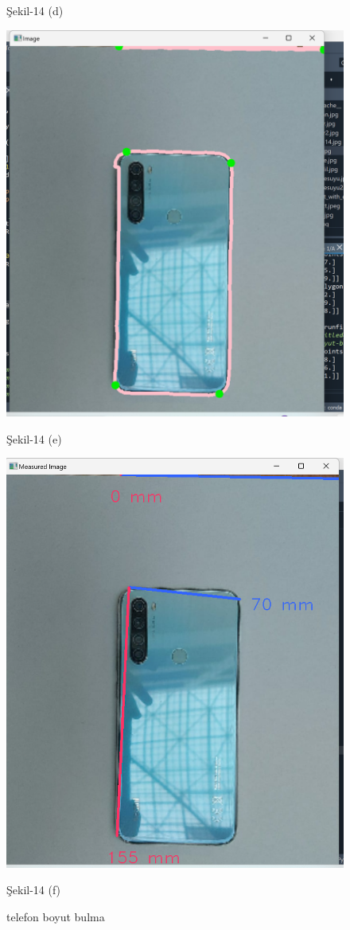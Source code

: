 \documentclass[11pt,a4paper]{report}
\begin{document}
\begin{figure}[!h]
\begin{minipage}[t]{0.470\linewidth}
			\caption*{Şekil-14 (d)}
		\end{minipage}
			\begin{minipage}[t]{0.470\linewidth}
			\centering
			\includegraphics[width=0.65\linewidth]{nesne-3-cerceve}
			\caption*{Şekil-14 (e)}
		\end{minipage}\hfill
		\begin{minipage}[t]{0.470\linewidth}
			\centering
			\includegraphics[width=0.65\linewidth]{boyut-bulma-sonuc-3}
			\caption*{Şekil-14 (f)}
		\end{minipage}
		\caption{telefon boyut bulma}
	\end{figure}
	\clearpage
\end{document}
